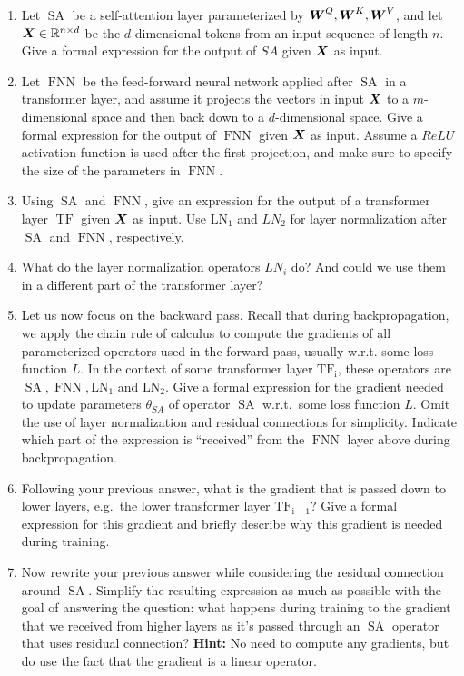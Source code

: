 \documentclass[11pt,a4paper]{article}
\newcommand\op[1]{\operatorname{#1}}
\begin{document}
\begin{enumerate}[label=(\alph*)]
    \item Let $\op{SA}$ be a self-attention layer parameterized by
          ${\boldsymbol{W}}^Q,{\boldsymbol{W}}^K,{\boldsymbol{W}}^V$, and let ${\boldsymbol{X}}\in \mathbb{R}^{n\times d}$ be the
          $d$-dimensional tokens from an input sequence of length $n$.
          Give a formal expression for the output of $SA$ given ${\boldsymbol{X}}$ as input.
    \item Let $\op{FNN}$ be the feed-forward neural network applied after
          $\op{SA}$ in a transformer layer, and assume it projects the vectors
          in input ${\boldsymbol{X}}$ to a $m$-dimensional space and then back down to a
          $d$-dimensional space.
          Give a formal expression for the output of $\op{FNN}$ given ${\boldsymbol{X}}$ as
          input.
          Assume a $ReLU$ activation function is used after the first
          projection, and make sure to specify the size of the parameters in
          $\op{FNN}$.
    \item Using $\op{SA}$ and $\op{FNN}$, give an expression for the output of a
          transformer layer $\op{TF}$ given ${\boldsymbol{X}}$ as input.
          Use $\op{LN_1}$ and ${LN_2}$ for layer normalization after $\op{SA}$
          and $\op{FNN}$, respectively.
    \item What do the layer normalization operators $LN_i$ do? And could we use
          them in a different part of the transformer layer?
    \item Let us now focus on the backward pass.
          Recall that during backpropagation, we apply the chain rule of
          calculus to compute the gradients of all parameterized operators used
          in the forward pass, usually w.r.t. some loss function $L$.
          In the context of some transformer layer $\op{TF_i}$, these operators
          are $\op{SA},\op{FNN},\op{LN_1}$ and $\op{LN_2}$.
          Give a formal expression for the gradient needed to update parameters
          $\theta_{SA}$ of operator $\op{SA}$ w.r.t.\ some loss function $L$.
          Omit the use of layer normalization and residual connections for
          simplicity.
          Indicate which part of the expression is ``received'' from the
          $\op{FNN}$ layer above during backpropagation.
    \item Following your previous answer, what is the gradient that is passed
          down to lower layers, e.g.\ the lower transformer layer
          $\op{TF_{i-1}}$?
          Give a formal expression for this gradient and briefly describe why
          this gradient is needed during training.
    \item Now rewrite your previous answer while considering the residual
          connection around $\op{SA}$.
          Simplify the resulting expression as much as possible with the goal of
          answering the question: what happens during training to the gradient
          that we received from higher layers as it's passed through an
          $\op{SA}$ operator that uses residual connection?
          \textbf{Hint:} No need to compute any gradients, but do use the fact
          that the gradient is a linear operator.
\end{enumerate}
\end{document}
